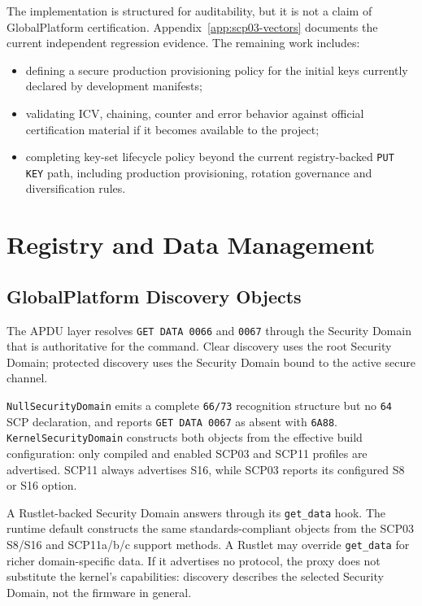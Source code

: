 The implementation is structured for auditability, but it is not a claim of
GlobalPlatform certification. Appendix~\ref{app:scp03-vectors} documents the
current independent regression evidence. The remaining work includes:

\begin{itemize}
\item defining a secure production provisioning policy for the initial keys
      currently declared by development manifests;
\item validating ICV, chaining, counter and error behavior against official
      certification material if it becomes available to the project;
\item completing key-set lifecycle policy beyond the current registry-backed
      \texttt{PUT KEY} path, including production provisioning, rotation
      governance and diversification rules.
\end{itemize}

\section{Registry and Data Management}
\label{sec:impl-registry}

\subsection{GlobalPlatform Discovery Objects}
\label{sec:impl-gp-discovery}

The APDU layer resolves \texttt{GET DATA 0066} and \texttt{0067} through the
Security Domain that is authoritative for the command. Clear discovery uses
the root Security Domain; protected discovery uses the Security Domain bound
to the active secure channel.

\texttt{NullSecurityDomain} emits a complete \texttt{66/73} recognition
structure but no \texttt{64} SCP declaration, and reports
\texttt{GET DATA 0067} as absent with \texttt{6A88}.
\texttt{KernelSecurityDomain} constructs both objects from the effective build
configuration: only compiled and enabled SCP03 and SCP11 profiles are
advertised. SCP11 always advertises S16, while SCP03 reports its configured S8
or S16 option.

A Rustlet-backed Security Domain answers through its \texttt{get\_data} hook.
The runtime default constructs the same standards-compliant objects from the
SCP03 S8/S16 and SCP11a/b/c support methods. A Rustlet may override
\texttt{get\_data} for richer domain-specific data. If it advertises no
protocol, the proxy does not substitute the kernel's capabilities: discovery
describes the selected Security Domain, not the firmware in general.

